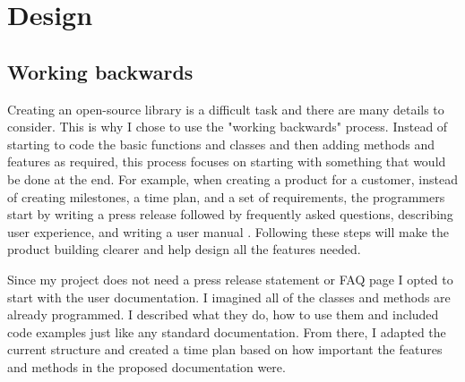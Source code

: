 \documentclass{l4proj}
\begin{document}
\chapter{Design}


\section{Working backwards}
Creating an open-source library is a difficult task and there are many details to consider. This is why I chose to use the "working backwards" process. Instead of starting to code the basic functions and classes and then adding methods and features as required, this process focuses on starting with something that would be done at the end. For example, when creating a product for a customer, instead of creating milestones, a time plan, and a set of requirements, the programmers start by writing a press release followed by frequently asked questions, describing user experience, and writing a user manual \cite{back}. Following these steps will make the product building clearer and help design all the features needed. \par
Since my project does not need a press release statement or FAQ page I opted to start with the user documentation. I imagined all of the classes and methods are already programmed. I described what they do, how to use them and included code examples just like any standard documentation. From there, I adapted the current structure and created a time plan based on how important the features and methods in the proposed documentation were. 
\end{document}
